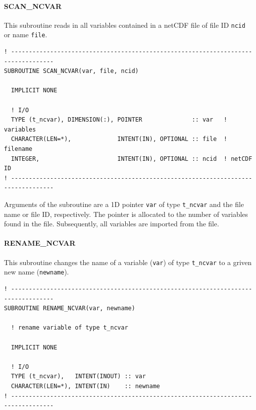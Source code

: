 \documentclass[11pt,twoside]{article}
\begin{document}
\paragraph{SCAN\_NCVAR\\\label{SCVAR}}
This subroutine reads in all variables contained in a netCDF file of file ID \verb|ncid| or name \verb|file|.

\begin{verbatim}
! ----------------------------------------------------------------------------------
SUBROUTINE SCAN_NCVAR(var, file, ncid)

  IMPLICIT NONE

  ! I/O
  TYPE (t_ncvar), DIMENSION(:), POINTER              :: var   ! variables
  CHARACTER(LEN=*),             INTENT(IN), OPTIONAL :: file  ! filename
  INTEGER,                      INTENT(IN), OPTIONAL :: ncid  ! netCDF ID
! ----------------------------------------------------------------------------------

\end{verbatim}
Arguments of the subroutine are  a 1D pointer \verb|var| of type 
\verb|t_ncvar| and the file name or file ID, respectively.
The pointer is allocated to the number of variables found in the file.
Subsequently, all variables are imported from the file.

\paragraph{RENAME\_NCVAR\\ \label{RNVAR}}

This subroutine changes the name of a variable (\verb|var|) of type 
\verb|t_ncvar| to a griven new name (\verb|newname|).
\begin{verbatim}
! ----------------------------------------------------------------------------------
SUBROUTINE RENAME_NCVAR(var, newname)

  ! rename variable of type t_ncvar

  IMPLICIT NONE

  ! I/O
  TYPE (t_ncvar),   INTENT(INOUT) :: var
  CHARACTER(LEN=*), INTENT(IN)    :: newname
! ----------------------------------------------------------------------------------

\end{verbatim}
\end{document}
